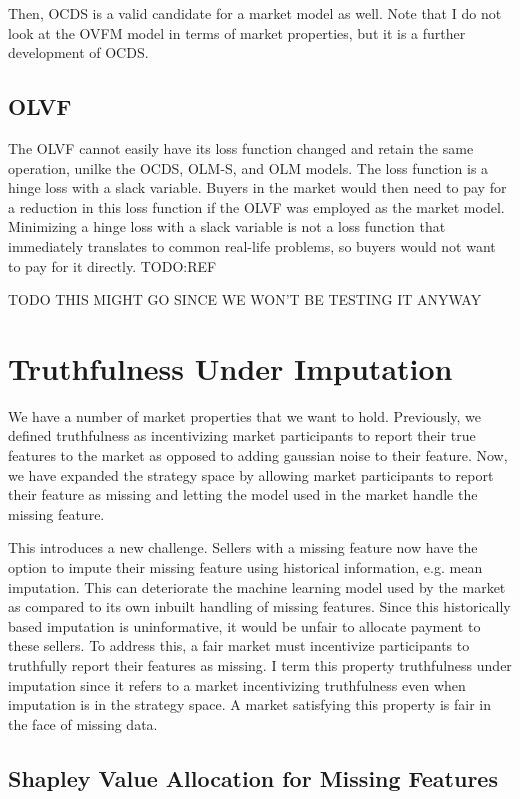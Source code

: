 Then, OCDS is a valid candidate for a market model as well. Note that I do not
look at the OVFM model in terms of market properties, but it is a further development of OCDS.

\subsection{OLVF}
The OLVF cannot easily have its loss function changed and retain the same
operation, unilke the OCDS, OLM-S, and OLM models. The loss function is a hinge
loss with a slack variable. Buyers in the market would then need to pay for a
reduction in this loss function if the OLVF was employed as the market model.
Minimizing a hinge loss with a slack variable is not a loss function that
immediately translates to common real-life problems, so buyers would not want
to pay for it directly. TODO:REF

TODO THIS MIGHT GO SINCE WE WON'T BE TESTING IT ANYWAY


\section{Truthfulness Under Imputation}
We have a number of market properties that we want to hold. Previously, we
defined truthfulness as incentivizing market participants to report their true
features to the market as opposed to adding gaussian noise to their feature.
Now, we have expanded the strategy space by allowing market participants to
report their feature as missing and letting the model used in the market handle
the missing feature.

This introduces a new challenge. Sellers with a missing feature now have the
option to impute their missing feature using historical information, e.g. mean
imputation. This can deteriorate the machine learning model used by the market
as compared to its own inbuilt handling of missing features. Since this
historically based imputation is uninformative, it would be unfair to allocate
payment to these sellers. To address this, a fair market must incentivize
participants to truthfully report their features as missing. I term this
property truthfulness under imputation since it refers to a market
incentivizing truthfulness even when imputation is in the strategy space. A
market satisfying this property is fair in the face of missing data.

\subsection{Shapley Value Allocation for Missing Features}

